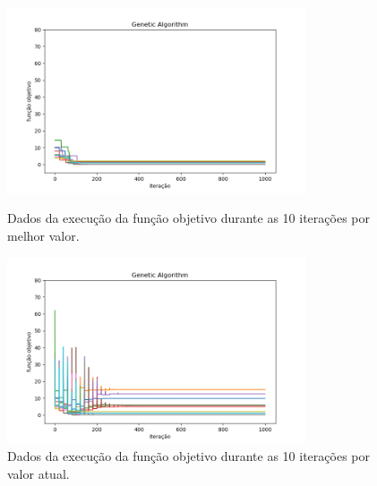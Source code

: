 \begin{figure}[H]
\centering
  \begin{minipage}[b]{0.48\textwidth}
    \includegraphics[width=88mm]{imagens/otima/problema-2-genetic-algorithm-funcao-objetivo-best.png}
    \caption{Dados da execução da função objetivo durante as 10 iterações por melhor valor.
    \label{fig:problema-2-genetic-algorithm-funcao-objetivo-best}}
  \end{minipage}
  \hfill
  \begin{minipage}[b]{0.48\textwidth}
    \includegraphics[width=88mm]{imagens/otima/problema-2-genetic-algorithm-funcao-objetivo-value.png}
    \caption{Dados da execução da função objetivo durante as 10 iterações por valor atual.
    \label{fig:problema-2-genetic-algorithm-funcao-objetivo-value}}
  \end{minipage}
\end{figure}